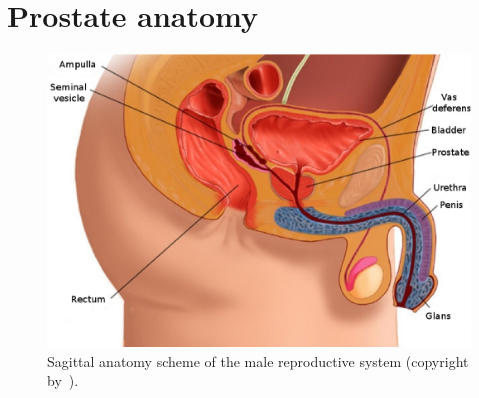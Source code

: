 
\section{Prostate anatomy}\label{section:intro:anatomy}

\begin{figure}
\centering
\includegraphics[height=0.25\textheight]{1_introduction/figures/anatomy/prostate2D.eps}
\caption[Sagittal anatomy of prostate.]{Sagittal anatomy scheme of the male reproductive system (copyright by~\cite{Geckomedia2011}).}
\label{fig:prostatelocation}
\end{figure}

